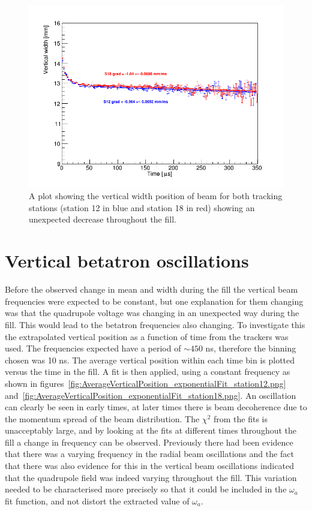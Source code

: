 \begin{figure}[ht]
\centering 
\includegraphics[scale=0.5]{Figures/AverageVerticalPosition_rebinWidthPeriod_both.png}
\decoRule
\caption{A plot showing the vertical width position of beam for both tracking stations (station 12 in blue and station 18 in red) showing an unexpected decrease throughout the fill.}
\label{fig:AverageVerticalPosition_rebinWidthPeriod_both.png}
\end{figure}

\section{Vertical betatron oscillations}

Before the observed change in mean and width during the fill the vertical beam frequencies were expected to be constant, but one explanation for them changing was that the quadrupole voltage was changing in an unexpected way during the fill. This would lead to the betatron frequencies also changing. To investigate this the extrapolated vertical position as a function of time from the trackers was used. The frequencies expected have a period of $\sim{450}$ ns, therefore the binning chosen was 10 ns. The average vertical position within each time bin is plotted versus the time in the fill. A fit is then applied, using a constant frequency as shown in figures~\ref{fig:AverageVerticalPosition_exponentialFit_station12.png} and~\ref{fig:AverageVerticalPosition_exponentialFit_station18.png}. An oscillation can clearly be seen in early times, at later times there is beam decoherence due to the momentum spread of the beam distribution. The $\chi^2$ from the fits is unacceptably large, and by looking at the fits at different times throughout the fill a change in frequency can be observed. Previously there had been evidence that there was a varying frequency in the radial beam oscillations and the fact that there was also evidence for this in the vertical beam oscillations indicated that the quadrupole field was indeed varying throughout the fill. This variation needed to be characterised more precisely so that it could be included in the $\omega_{a}$ fit function, and not distort the extracted value of $\omega_{a}$.

